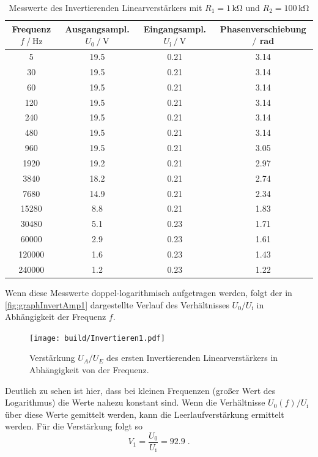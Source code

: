 \begin{table}
    \centering
    \caption{Messwerte des Invertierenden Linearverstärkers mit $R_1=1\,\unit{\kilo\ohm}$ und $R_2=100\,\unit{\kilo\ohm}$}
    \begin{tabular}{c c c c}
        \toprule
        Frequenz $f\mathbin{/}\unit{\hertz}$ & Ausgangsampl. $U_0\mathbin{/}\unit{\volt}$& Eingangsampl. $U_{\text{i}}\mathbin{/}\unit{\volt}$ & Phasenverschiebung $\mathbin{/}$ rad\\
        \midrule
        5	&19.5	&0.21&	3.14\\
        30&	19.5	&0.21&	3.14\\
        60&	19.5	&0.21&	3.14\\
        120&	19.5&	0.21&	3.14\\
        240&	19.5&	0.21&	3.14\\
        480	&19.5	&0.21&	3.14\\
        960	&19.5	&0.21&	3.05\\
        1920&	19.2&	0.21&	2.97\\
        3840&	18.2&	0.21&	2.74\\
        7680&	14.9&	0.21&	2.34\\
        15280&	8.8&	0.21&	1.83\\
        30480&	5.1	&0.23& 1.71\\
        60000&	2.9	&0.23&	1.61\\
        120000&	1.6	&0.23&	1.43\\
        240000&	1.2	&0.23&	1.22\\
        \bottomrule
    \end{tabular}
    \label{tab:InvAmp1}
\end{table}
Wenn diese Messwerte doppel-logarithmisch aufgetragen werden, folgt der in \autoref{fig:graphInvertAmp1} dargestellte Verlauf des Verhältnisses $U_0/U_{\text{i}}$ in Abhängigkeit der Frequenz $f$.

\begin{figure}
    \centering
    \texttt{[image: build/Invertieren1.pdf]}
    \caption{Verstärkung $U_A/U_E$ des ersten Invertierenden Linearverstärkers in Abhängigkeit von der Frequenz.}
    \label{fig:graphInvertAmp1}
\end{figure}
Deutlich zu sehen ist hier, dass bei kleinen Frequenzen (großer Wert des Logarithmus) die Werte nahezu konstant sind. Wenn  die Verhältnisse $U_0(f)/U_{\text{i}}$ über diese  Werte gemittelt werden, kann die Leerlaufverstärkung ermittelt werden.
Für die Verstärkung folgt so 
\begin{equation*}
    V_1=\frac{U_0}{U_{\text{i}}}= 92.9  \; .
\end{equation*}

